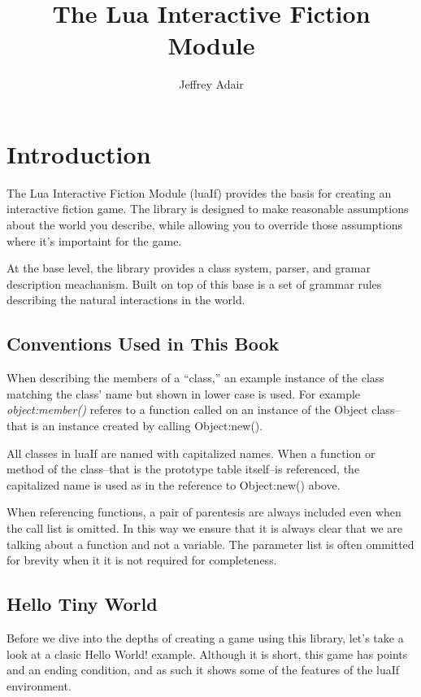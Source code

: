 \documentclass{book}
\title{The Lua Interactive Fiction Module}
\author{Jeffrey Adair}
\begin{document}
\maketitle

\chapter{Introduction}

The Lua Interactive Fiction Module (luaIf) provides the basis for
creating an interactive fiction game. The library is designed to make
reasonable assumptions about the world you describe, while allowing
you to override those assumptions where it's importaint for the game.

At the base level, the library provides a class system, parser, and
gramar description meachanism. Built on top of this base is a set of
grammar rules describing the natural interactions in the world.

\section{Conventions Used in This Book}

When describing the members of a ``class,'' an example instance of the
class matching the class' name but shown in lower case is used. For
example \emph{object:member()} referes to a function called on an
instance of the Object class--that is an instance created by calling
Object:new().

All classes in luaIf are named with capitalized names. When a function
or method of the class--that is the prototype table itself--is
referenced, the capitalized name is used as in the reference to
Object:new() above.

When referencing functions, a pair of parentesis are always included
even when the call list is omitted. In this way we ensure that it is
always clear that we are talking about a function and not a
variable. The parameter list is often ommitted for brevity when it it
is not required for completeness.

\section{Hello Tiny World}

Before we dive into the depths of creating a game using this library,
let's take a look at a clasic Hello World! example. Although it is
short, this game has points and an ending condition, and as such it
shows some of the features of the luaIf environment.
\end{document}
